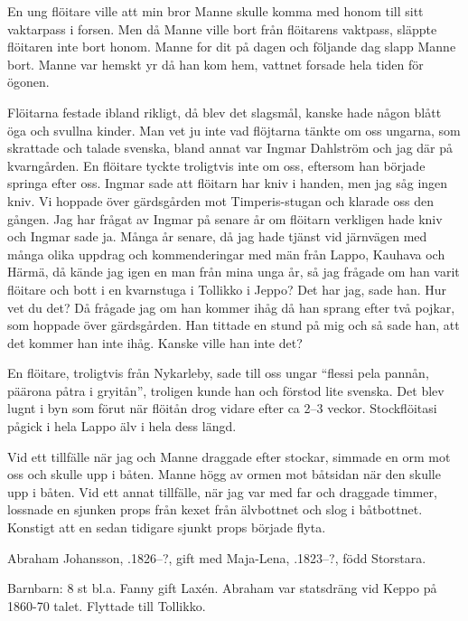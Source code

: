 En ung flöitare ville att min bror Manne skulle komma med honom till sitt vaktarpass i forsen. Men då Manne ville bort från flöitarens vaktpass, släppte flöitaren inte bort honom. Manne for dit på dagen och följande dag slapp Manne bort. Manne var hemskt yr då han kom hem, vattnet forsade hela tiden för ögonen.

Flöitarna festade ibland rikligt, då blev det slagsmål, kanske hade någon blått öga och svullna kinder. Man vet ju inte vad flöjtarna tänkte om oss ungarna, som skrattade och talade svenska, bland annat var Ingmar Dahlström och jag där på kvarngården. En flöitare tyckte troligtvis inte om oss, eftersom han började springa efter oss. Ingmar sade att flöitarn har kniv i handen, men jag såg ingen kniv. Vi hoppade över gärdsgården mot Timperis-stugan och klarade oss den gången. Jag har frågat av Ingmar på senare år om flöitarn verkligen hade kniv och Ingmar sade ja. Många år senare, då jag hade tjänst vid järnvägen med många olika uppdrag och kommenderingar med män från Lappo, Kauhava och Härmä, då kände jag igen en man från mina unga år, så jag frågade om han varit flöitare och bott i en kvarnstuga i Tollikko i Jeppo? Det har jag, sade han. Hur vet du det? Då frågade jag om han kommer ihåg då han sprang efter två pojkar, som hoppade över gärdsgården. Han tittade en stund på mig och så sade han, att det kommer han inte ihåg. Kanske ville han inte det?

En flöitare, troligtvis från Nykarleby, sade till oss ungar ``flessi pela pannån, päärona påtra i gryitån'', troligen kunde han och förstod lite svenska. Det blev lugnt i byn som förut när flöitån drog vidare efter ca 2--3 veckor. Stockflöitasi pågick i hela Lappo älv i hela dess längd.

Vid ett tillfälle när jag och Manne draggade efter stockar, simmade en orm mot oss och skulle upp i båten. Manne högg av ormen mot båtsidan när den skulle upp i båten. Vid ett annat tillfälle, när jag var med far och draggade timmer, lossnade en sjunken props från kexet från älvbottnet och slog i båtbottnet. Konstigt att en sedan tidigare sjunkt props började flyta.


%


%
Abraham Johansson, .1826--?, gift med Maja-Lena, .1823--?, född Storstara.
\begin{jhchildren}
  \item {}
  \item {}
\end{jhchildren}
Barnbarn: 8 st bl.a. Fanny gift Laxén. Abraham var statsdräng vid Keppo på 1860-70 talet. Flyttade till Tollikko.


